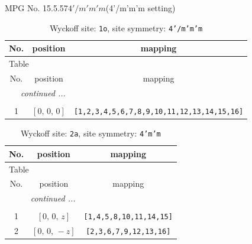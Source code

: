\documentclass[fleqn,8pt]{jsarticle}
\begin{document}
\setcounter{MaxMatrixCols}{32}

\renewcommand{\tablename}{Table~}
\renewcommand{\figurename}{Figure~}
\begin{center}
\LARGE
MPG No. 15.5.57\quad$4'/m'm'm$\quad(4'/m'm'm setting)
\end{center}
\renewcommand{\arraystretch}{1.2}
\begin{longtable}{ccc}
\caption{Wyckoff site: {\tt 1o}, site symmetry: {\tt 4'/m'm'm}}
 \\
 \hline \hline
No. & position & mapping \\ \hline \endfirsthead

\multicolumn{2}{l}{\tablename\ \thetable{}} \\
 \hline \hline
No. & position & mapping \\ \hline \endhead

 \hline \hline
\multicolumn{2}{r}{\footnotesize\it continued ...} \\ \endfoot

 \hline \hline
\multicolumn{2}{r}{} \\ \endlastfoot

1 & $\left[ 0,\, 0,\, 0 \right]$ & {\tt [1,2,3,4,5,6,7,8,9,10,11,12,13,14,15,16]} \\
\end{longtable}
\renewcommand{\arraystretch}{1.2}
\begin{longtable}{ccc}
\caption{Wyckoff site: {\tt 2a}, site symmetry: {\tt 4'm'm}}
 \\
 \hline \hline
No. & position & mapping \\ \hline \endfirsthead

\multicolumn{2}{l}{\tablename\ \thetable{}} \\
 \hline \hline
No. & position & mapping \\ \hline \endhead

 \hline \hline
\multicolumn{2}{r}{\footnotesize\it continued ...} \\ \endfoot

 \hline \hline
\multicolumn{2}{r}{} \\ \endlastfoot

1 & $\left[ 0,\, 0,\, z \right]$ & {\tt [1,4,5,8,10,11,14,15]} \\ \hline
2 & $\left[ 0,\, 0,\, - z \right]$ & {\tt [2,3,6,7,9,12,13,16]} \\
\end{longtable}
\renewcommand{\arraystretch}{1.2}
\end{document}
